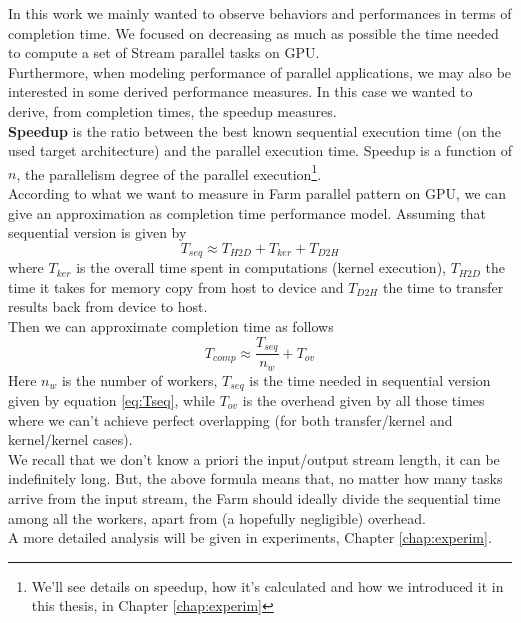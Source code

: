 	In this work we mainly wanted to observe behaviors and performances in terms of completion time. We focused on decreasing as much as possible the time needed to compute a set of Stream parallel tasks on GPU.\\
	Furthermore, when modeling performance of parallel applications, we may also be interested in some derived performance measures. In this case we wanted to derive, from completion times, the speedup measures. \\
	\textbf{Speedup} is the ratio between the best known sequential execution time (on the used target architecture) and the parallel execution time. Speedup is a function of \(n\), the parallelism degree of the parallel execution\footnote{We'll see details on speedup, how it's calculated and how we introduced it in this thesis, in Chapter \ref{chap:experim}}.\\
	According to what we want to measure in Farm parallel pattern on GPU, we can give an approximation as completion time performance model.
	Assuming that sequential version is given by
	\begin{equation}\label{eq:Tseq}
		T_{seq}\approx T_{H2D} + T_{ker} + T_{D2H}
	\end{equation}
	where \(T_{ker}\) is the overall time spent in computations (kernel execution), \(T_{H2D}\) the time it takes for memory copy from host to device and \(T_{D2H}\) the time to transfer results back from device to host.\\
	Then we can approximate completion time as follows	
	\begin{equation}
	T_{comp} \approx  \frac{T_{seq}}{n_w} + T_{ov}
	\end{equation}
	Here \(n_w\) is the number of workers, \(T_{seq}\) is the time needed in sequential version given by equation \ref{eq:Tseq}, while \(T_{ov}\) is the overhead given by all those times where we can't achieve perfect overlapping (for both transfer/kernel and kernel/kernel cases).\\
	We recall that we don't know a priori the input/output stream length, it can be indefinitely long. But, the above formula means that, no matter how many tasks arrive from the input stream, the Farm should ideally divide the sequential time among all the workers, apart from (a hopefully negligible) overhead.\\ 
	A more detailed analysis will be given in experiments, Chapter \ref{chap:experim}.


	



